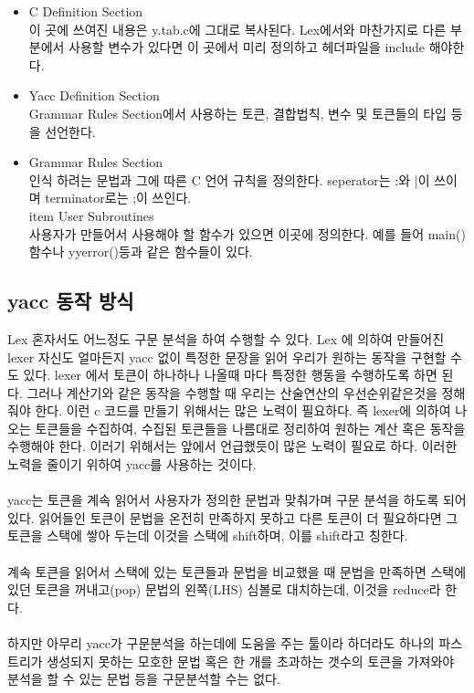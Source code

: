 \documentclass{article}
\begin{document}
\begin{itemize}
    \item C Definition Section\\ 이 곳에 쓰여진 내용은 y.tab.c에 그대로 복사된다. Lex에서와 마찬가지로 다른 부분에서 사용할 변수가 있다면 이 곳에서 미리 정의하고 헤더파일을 include 해야한다.
    \item Yacc Definition Section\\ Grammar Rules Section에서 사용하는 토큰, 결합법칙, 변수 및 토큰들의 타입 등을 선언한다.
    \item Grammar Rules Section\\ 인식 하려는 문법과 그에 따른 C 언어 규칙을 정의한다. seperator는 :와 |이 쓰이며 terminator로는 ;이 쓰인다.
    \\item User Subroutines \\ 사용자가 만들어서 사용해야 할 함수가 있으면 이곳에 정의한다. 예를 들어 main()함수나 yyerror()등과 같은 함수들이 있다.
\end{itemize}
\par

\subsection{yacc 동작 방식}
Lex 혼자서도 어느정도 구문 분석을 하여 수행할 수 있다. Lex 에 의하여 만들어진 lexer 자신도 얼마든지 yacc 없이 특정한 문장을 읽어 우리가 원하는 동작을 구현할 수도 있다. lexer 에서 토큰이 하나하나 나올때 마다 특정한 행동을 수행하도록 하면 된다. 그러나 계산기와 같은 동작을 수행할 때 우리는 산술연산의 우선순위같은것을 정해 줘야 한다. 이런 c 코드를 만들기 위해서는 많은 노력이 필요하다. 즉 lexer에 의하여 나오는 토큰들을 수집하여, 수집된 토큰들을 나름대로 정리하여 원하는 계산 혹은 동작을 수행해야 한다. 이러기 위해서는 앞에서 언급했듯이 많은 노력이 필요로 하다. 이러한 노력을 줄이기 위하여 yacc를 사용하는 것이다.\\\\
yacc는 토큰을 계속 읽어서 사용자가 정의한 문법과 맞춰가며 구문 분석을 하도록 되어있다. 읽어들인 토큰이 문법을 온전히 만족하지 못하고 다른 토큰이 더 필요하다면 그 토큰을 스택에 쌓아 두는데 이것을 스택에 shift하며, 이를 shift라고 칭한다.\\\\
계속 토큰을 읽어서 스택에 있는 토큰들과 문법을 비교했을 때 문법을 만족하면 스택에 있던 토큰을 꺼내고(pop) 문법의 왼쪽(LHS) 심볼로 대치하는데, 이것을 reduce라 한다.\\\\
하지만 아무리 yacc가 구문분석을 하는데에 도움을 주는 툴이라 하더라도 하나의 파스 트리가 생성되지 못하는 모호한 문법 혹은 한 개를 초과하는 갯수의 토큰을 가져와야 분석을 할 수 있는 문법 등을 구문분석할 수는 없다.\\\\
\end{document}

